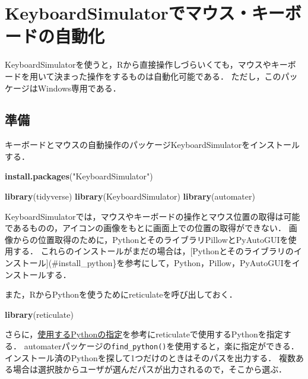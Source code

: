 \documentclass[
]{article}
\newenvironment{Shaded}{\begin{snugshade}}{\end{snugshade}}
\newcommand{\FunctionTok}[1]{\textcolor[rgb]{0.13,0.29,0.53}{\textbf{#1}}}
\newcommand{\NormalTok}[1]{#1}
\newcommand{\StringTok}[1]{\textcolor[rgb]{0.31,0.60,0.02}{#1}}
\begin{document}
\hypertarget{keyboardsimulator}{%
\section{KeyboardSimulatorでマウス・キーボードの自動化}\label{keyboardsimulator}}

KeyboardSimulatorを使うと，Rから直接操作しづらいくても，マウスやキーボードを用いて決まった操作をするものは自動化可能である．
ただし，このパッケージはWindows専用である．

\hypertarget{ux6e96ux5099-8}{%
\subsection{準備}\label{ux6e96ux5099-8}}

キーボードとマウスの自動操作のパッケージKeyboardSimulatorをインストールする．

\begin{Shaded}
\begin{Highlighting}[]
\FunctionTok{install.packages}\NormalTok{(}\StringTok{"KeyboardSimulator"}\NormalTok{)}
\end{Highlighting}
\end{Shaded}

\begin{Shaded}
\begin{Highlighting}[]
\FunctionTok{library}\NormalTok{(tidyverse)}
\FunctionTok{library}\NormalTok{(KeyboardSimulator)}
\FunctionTok{library}\NormalTok{(automater)}
\end{Highlighting}
\end{Shaded}

KeyboardSimulatorでは，マウスやキーボードの操作とマウス位置の取得は可能であるものの，アイコンの画像をもとに画面上での位置の取得ができない．
画像からの位置取得のために，PythonとそのライブラリPillowとPyAutoGUIを使用する．
これらのインストールがまだの場合は，{[}Pythonとそのライブラリのインストール{]}(\#install\_python\}を参考にして，Python，Pillow，PyAutoGUIをインストールする．

また，RからPythonを使うためにreticulateを呼び出しておく．

\begin{Shaded}
\begin{Highlighting}[]
\FunctionTok{library}\NormalTok{(reticulate)}
\end{Highlighting}
\end{Shaded}

さらに，\protect\hyperlink{identify_python}{使用するPythonの指定}を参考にreticulateで使用するPythonを指定する．
automaterパッケージの\texttt{find\_python()}を使用すると，楽に指定ができる．
インストール済のPythonを探して1つだけのときはそのパスを出力する．
複数ある場合は選択肢からユーザが選んだパスが出力されるので，そこから選ぶ．
\end{document}
